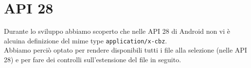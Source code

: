 \documentclass[../Assignment-3-LPSMT.tex]{subfiles}
\begin{document}
\section{API 28}

Durante lo sviluppo abbiamo scoperto che nelle API 28 di Android non vi è alcuina definizione del mime type \texttt{application/x-cbz}.\\
Abbiamo perciò optato per rendere disponibili tutti i file alla selezione (nelle API 28) e per fare dei controlli sull'estensione del file in seguito.
\end{document}
